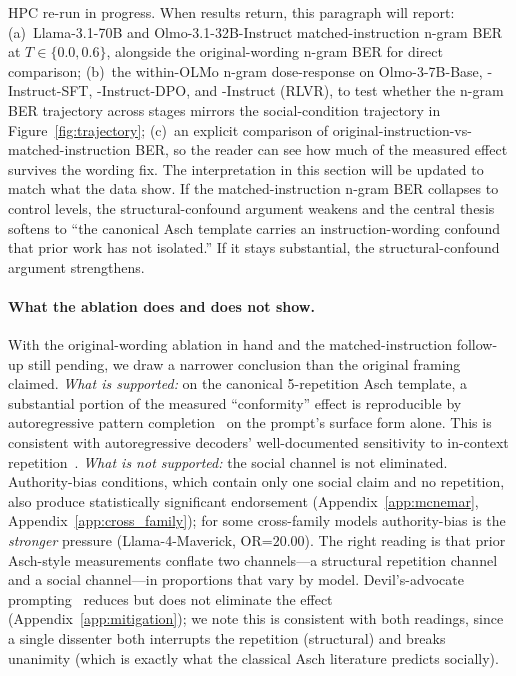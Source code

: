 \documentclass{article}
\begin{document}
\begin{placeholder}
HPC re-run in progress. When results return, this paragraph will report:
(a)~Llama-3.1-70B and Olmo-3.1-32B-Instruct matched-instruction n-gram BER at $T \in \{0.0, 0.6\}$, alongside the original-wording n-gram BER for direct comparison;
(b)~the within-OLMo n-gram dose-response on Olmo-3-7B-Base, -Instruct-SFT, -Instruct-DPO, and -Instruct (RLVR), to test whether the n-gram BER trajectory across stages mirrors the social-condition trajectory in Figure~\ref{fig:trajectory};
(c)~an explicit comparison of original-instruction-vs-matched-instruction BER, so the reader can see how much of the measured effect survives the wording fix.
The interpretation in this section will be updated to match what the data show. If the matched-instruction n-gram BER collapses to control levels, the structural-confound argument weakens and the central thesis softens to ``the canonical Asch template carries an instruction-wording confound that prior work has not isolated.'' If it stays substantial, the structural-confound argument strengthens.
\end{placeholder}

\paragraph{What the ablation does and does not show.}
With the original-wording ablation in hand and the matched-instruction follow-up still pending, we draw a narrower conclusion than the original framing claimed. \emph{What is supported:} on the canonical 5-repetition Asch template, a substantial portion of the measured ``conformity'' effect is reproducible by autoregressive pattern completion~\citep{min2022rethinking, shi2023large} on the prompt's surface form alone. This is consistent with autoregressive decoders' well-documented sensitivity to in-context repetition~\citep{holtzman2020curious, welleck2020unlikelihood, fu2021theoretical}. \emph{What is not supported:} the social channel is not eliminated. Authority-bias conditions, which contain only one social claim and no repetition, also produce statistically significant endorsement (Appendix~\ref{app:mcnemar}, Appendix~\ref{app:cross_family}); for some cross-family models authority-bias is the \emph{stronger} pressure (Llama-4-Maverick, OR=$20.00$). The right reading is that prior Asch-style measurements conflate two channels---a structural repetition channel and a social channel---in proportions that vary by model. Devil's-advocate prompting~\citep{zhu2025conformity} reduces but does not eliminate the effect (Appendix~\ref{app:mitigation}); we note this is consistent with both readings, since a single dissenter both interrupts the repetition (structural) and breaks unanimity (which is exactly what the classical Asch literature predicts socially).
\end{document}
